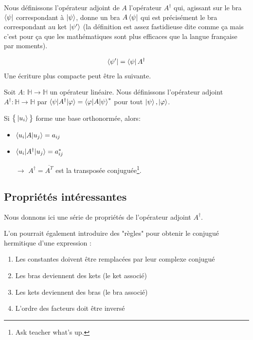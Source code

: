 \documentclass[../notesdecours.tex]{subfiles}
\begin{document}
Nous définissons l'opérateur adjoint de $A$ l'opérateur $A^\dagger$ qui, agissant sur le bra $\bra \psi$ correspondant à $\ket \psi$, donne un bra $A\bra {\psi}$ qui est précisément le bra correspondant au ket $\ket{\psi '}$ (la définition est assez fastidieuse dite comme ça mais c'est pour ça que les mathématiques sont plus efficaces que la langue française par moments).

$$\bra{\psi '} = \bra{\psi} A^\dagger$$
Une écriture plus compacte peut être la suivante.
\begin{definition} Soit $A$: $\mathbb{H} \rightarrow \mathbb{H}$ un opérateur linéaire. Nous définissons l'opérateur adjoint $A^\dag : \mathbb{H} \rightarrow \mathbb{H}$ par $\braket{\psi|A^\dag|\varphi} = \braket{\varphi|A|\psi}^*$ pour tout $\ket{\psi},\ket{\varphi}$. \end{definition}

Si $\big\{\ket{u_i}\big\}$ forme une base orthonormée, alors:
\begin{itemize}
\item $\braket{u_i|A|u_j} = a_{ij}$
\item $\braket{u_i|A^\dag|u_j} = a^*_{ij}$
\item[$\rightarrow$] $A^\dag = \overline{A^T}$ est la transposée conjuguée\footnote{Ask teacher what's up.}.\\
\end{itemize}
\subsection{Propriétés intéressantes}
Nous donnons ici une série de propriétés de l'opérateur adjoint $A^\dag$.
\begin{center}
\end{center}
L'on pourrait également introduire des "règles" pour obtenir le conjugué hermitique d'une expression :
\begin{enumerate}
	\item Les constantes doivent être remplacées par leur complexe conjugué
	\item Les bras deviennent des kets (le ket associé)
	\item Les kets deviennent des bras (le bra associé)
	\item L'ordre des facteurs doit être inversé
\end{enumerate}
\end{document}
